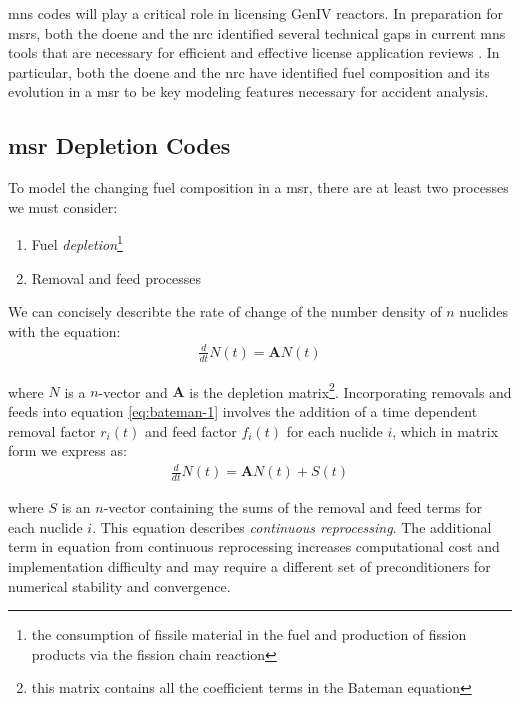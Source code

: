 \documentclass[letterpaper]{mc2023}
\begin{document}
\Gls{mns} codes will play a critical role in licensing GenIV reactors. In
preparation for \Gls{msr}s, both the \Gls{doene} and the \Gls{nrc}
identified several technical gaps in current \Gls{mns} tools that are necessary
for efficient and effective license application reviews
\cite{betzler_modeling_2019} \cite{usnrc_nonlwr_2020-1}. In particular, both the
\Gls{doene} and the \Gls{nrc} have identified fuel composition and its
evolution in a \Gls{msr} to be key modeling features necessary for accident
analysis. 

\subsection{\Gls{msr} Depletion Codes}%
\label{sec:msr_codes}

To model the changing fuel composition in a \Gls{msr}, there are at least two
processes we must consider:
\begin{enumerate}
    \item Fuel {\it depletion}\footnote{the consumption of fissile material in the fuel and production of fission products via the fission chain reaction}
    \item Removal and feed processes
\end{enumerate}

We can concisely describte the rate of change of the number density of $n$ nuclides with the equation:
\begin{align}
    \label{eq:bateman-1}
    \frac{d}{dt}N(t) = \mathbf{A}N(t)
\end{align}

where $N$ is a $n$-vector and $\mathbf{A}$ is the depletion matrix\footnote{this
matrix contains all the coefficient terms in the Bateman equation}.
Incorporating removals and feeds into equation \ref{eq:bateman-1} involves
the addition of a time dependent removal factor $r_{i}(t)$ and feed factor
$f_{i}(t)$ for each nuclide $i$, which in matrix form we express as:
\begin{align}
    \label{eq:bateman-1}
    \frac{d}{dt}N(t) = \mathbf{A}N(t) + S(t)
\end{align}

where $S$ is an $n$-vector containing the sums of the removal and feed terms
for each nuclide $i$. This equation describes {\it continuous reprocessing}.
The additional term in equation from continuous reprocessing increases
computational cost and implementation difficulty and may require a different set
of preconditioners for numerical stability and convergence.
\end{document}
